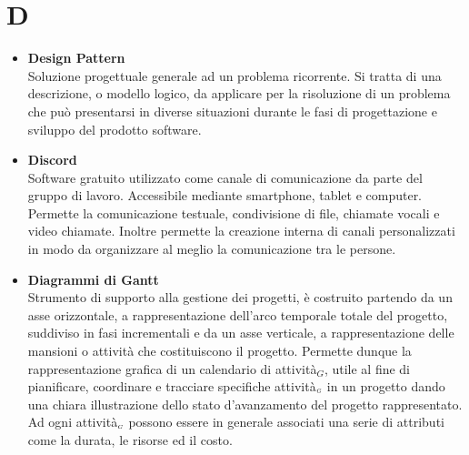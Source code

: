 \chapter{D} \label{D}
	\begin{itemize}		
		\item \textbf{Design Pattern}\\
		Soluzione progettuale generale ad un problema ricorrente. Si tratta di una descrizione, o modello logico, da applicare per la risoluzione di un problema che può presentarsi in diverse situazioni durante le fasi di progettazione e sviluppo del prodotto software.
		
		\item \textbf{Discord}\\
		Software gratuito utilizzato come canale di comunicazione da parte del gruppo di lavoro.
		Accessibile mediante smartphone, tablet e computer.
		Permette la comunicazione testuale, condivisione di file, chiamate vocali e video chiamate.
		Inoltre permette la creazione interna di canali personalizzati in modo da organizzare al meglio la comunicazione tra le persone.
		
		\item \textbf{Diagrammi di Gantt}\\
		Strumento di supporto alla gestione dei progetti, è costruito partendo da un asse orizzontale, a rappresentazione dell'arco temporale totale del progetto, suddiviso in fasi incrementali  e da un asse verticale, a rappresentazione delle mansioni o attività che costituiscono il progetto. Permette dunque la rappresentazione grafica di un calendario di attività$_G$, utile al fine di pianificare, coordinare e tracciare specifiche attività$_{\scaleto{G}{3pt}}$ in un progetto dando una chiara illustrazione dello stato d'avanzamento del progetto rappresentato.  Ad ogni attività$_{\scaleto{G}{3pt}}$ possono essere in generale associati una serie di attributi come la durata, le risorse ed il costo.
		
	\end{itemize}